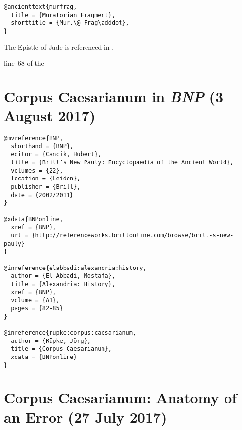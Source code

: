 \documentclass[a4paper]{article}
\begin{document}
\begin{verbatim}
@ancienttext{murfrag,
  title = {Muratorian Fragment},
  shorttitle = {Mur.\@ Frag\adddot},
}
\end{verbatim}

\begin{verbcite}
  The Epistle of Jude is referenced in \cite[(68)]{murfrag}.
\end{verbcite}
\begin{verbcite}
  \parencite[(\lineno~68)]{murfrag}
\end{verbcite}
\begin{verbcite}
  line~68 of the 
\end{verbcite}
\exampleancientsources
{}

\section{Corpus Caesarianum in \emph{BNP} (3 August 2017)}

\begin{verbatim}
@mvreference{BNP,
  shorthand = {BNP},
  editor = {Cancik, Hubert},
  title = {Brill’s New Pauly: Encyclopaedia of the Ancient World},
  volumes = {22},
  location = {Leiden},
  publisher = {Brill},
  date = {2002/2011}
}

@xdata{BNPonline,
  xref = {BNP},
  url = {http://referenceworks.brillonline.com/browse/brill-s-new-pauly}
}

@inreference{elabbadi:alexandria:history,
  author = {El-Abbadi, Mostafa},
  title = {Alexandria: History},
  xref = {BNP},
  volume = {A1},
  pages = {82-85}
}

@inreference{rupke:corpus:caesarianum,
  author = {Rüpke, Jörg},
  title = {Corpus Caesarianum},
  xdata = {BNPonline}
}
\end{verbatim}

\exampleabbreviations
\examplebibliography
{}

\section{Corpus Caesarianum: Anatomy of an Error (27 July 2017)}
\end{document}
